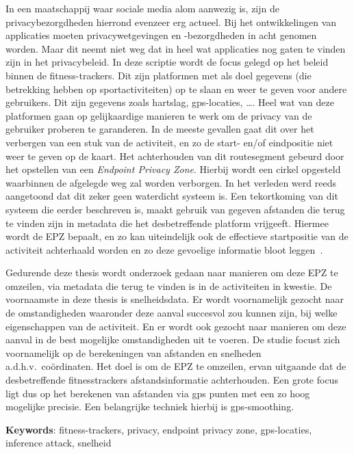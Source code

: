 
In een maatschappij waar sociale media alom aanwezig is, zijn de
privacybezorgdheden hierrond evenzeer erg actueel. Bij het ontwikkelingen van
applicaties moeten privacywetgevingen en -bezorgdheden in acht genomen worden.
Maar dit neemt niet weg dat in heel wat applicaties nog gaten te vinden zijn in
het privacybeleid. In deze scriptie wordt de focus gelegd op het beleid binnen
de fitness-trackers. Dit zijn platformen met als doel gegevens (die betrekking
hebben op sportactiviteiten) op te slaan en weer te geven voor andere
gebruikers. Dit zijn gegevens zoals hartslag, gps-locaties, \ldots. Heel wat
van deze platformen gaan op gelijkaardige manieren te werk om de privacy van de
gebruiker proberen te garanderen. In de meeste gevallen gaat dit over het
verbergen van een stuk van de activiteit, en zo de start- en/of eindpositie
niet weer te geven op de kaart. Het achterhouden van dit routesegment gebeurd
door het opstellen van een \textit{Endpoint Privacy Zone}. Hierbij wordt een
cirkel opgesteld waarbinnen de afgelegde weg zal worden verborgen. In het
verleden werd reeds aangetoond dat dit zeker geen waterdicht systeem is. Een
tekortkoming van dit systeem die eerder beschreven is, maakt gebruik van
gegeven afstanden die terug te vinden zijn in metadata die het desbetreffende
platform vrijgeeft. Hiermee wordt de EPZ bepaalt, en zo kan uiteindelijk ook de
effectieve startpositie van de activiteit achterhaald worden en zo deze
gevoelige informatie bloot
leggen~\cite{Dhondt_Pochat_Voulimeneas_Joosen_Volckaert_2022}.

Gedurende deze thesis wordt onderzoek gedaan naar manieren om deze EPZ te
omzeilen, via metadata die terug te vinden is in de activiteiten in kwestie. De
voornaamste in deze thesis is snelheidsdata. Er wordt voornamelijk gezocht naar
de omstandigheden waaronder deze aanval succesvol zou kunnen zijn, bij welke
eigenschappen van de activiteit. En er wordt ook gezocht naar manieren om deze
aanval in de best mogelijke omstandigheden uit te voeren. De studie focust zich
voornamelijk op de berekeningen van afstanden en snelheden a.d.h.v.\
coördinaten. Het doel is om de EPZ te omzeilen, ervan uitgaande dat de
desbetreffende fitnesstrackers afstandsinformatie achterhouden. Een grote focus
ligt dus op het berekenen van afstanden via gps punten met een zo hoog
mogelijke precisie. Een belangrijke techniek hierbij is gps-smoothing.


\textbf{Keywords}: fitness-trackers, privacy, endpoint privacy zone,
gps-locaties, inference attack, snelheid